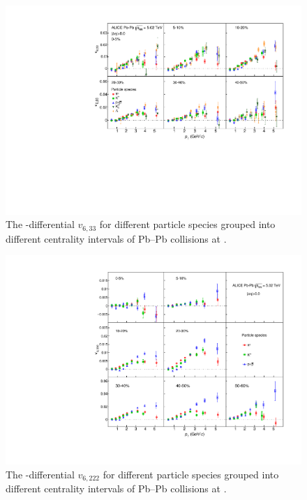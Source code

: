 \begin{figure}[!htb]
\begin{center}
\includegraphics[scale=0.82]{figures/results/All_v633_gap00_PID2_3by2.pdf}

\end{center}
\caption{The \pT-differential $v_{6,33}$ for different particle species grouped into different centrality intervals of Pb--Pb collisions at \sNN.}
\label{v633_particleDependence}
\end{figure}

\begin{figure}[!htb]
\begin{center}
\includegraphics[scale=0.82]{figures/results/All_v6222_gap00_PID2_3by3.pdf}

\end{center}
\caption{The \pT-differential $v_{6,222}$ for different particle species grouped into different centrality intervals of Pb--Pb collisions at \sNN.}
\label{v6222_particleDependence}
\end{figure}

